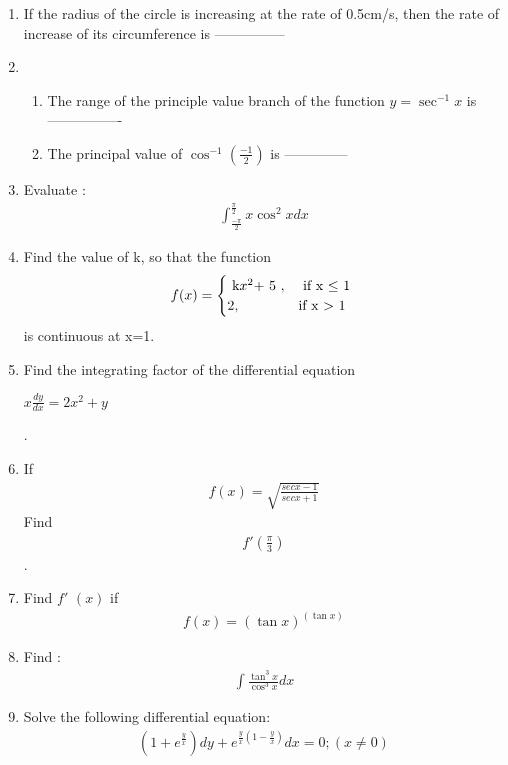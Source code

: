 \documentclass[journal,12pt,twocolumn]{IEEEtran}
\renewcommand\thesection{\arabic{section}}
\begin{document}
\begin{enumerate}[label=\thesection.\arabic*.,ref=\thesection.\theenumi]
\item  If the radius of the circle is increasing at the rate of 0.5cm/s, then the rate of increase of its circumference is ---------------\\
\item \begin{enumerate} \item The range of the principle value branch of the function $ y= \sec^{-1}x $ is ----------------
    
\item The principal value of $\cos^{-1} \left(\frac{-1}{2}\right)$ is --------------\\
\end{enumerate}

\item  Evaluate :
	\begin{align}
         \int_{\frac{-\pi}{2}}^{\frac{\pi}{2}} x \cos^2 x dx \nonumber
	\end{align}  


\item  Find the value of k, so that the function \begin{equation*}  f(x)  = \begin{cases}
                $ k$ x^2 $+ 5 $ ,  &\text{ if  x $\leq$ 1 } \\
        2 , &\text{if x $ > $ 1}
\end{cases} \end{equation*}  is continuous at x=1. \\
\item  Find the integrating factor of the differential equation \begin{center} $ x\frac{dy}{dx} = 2x^2 +y $ \end{center} .
\item If \begin{align} f\left(x\right)= \sqrt{\frac{sec x-1}{sec x+1}}\nonumber \end{align} Find \begin{align} f'\left(\frac{\pi}{3}\right) \nonumber \end{align}.

\item Find $f'$ $\left(x\right)$ if \begin{align} f\left(x\right)=\left(\tan x\right)^{\left(\tan x\right)} \nonumber \end{align}

\item Find :\begin{align} \int \frac{\tan^3x}{\cos^3x} dx \nonumber \end{align} 



\item Solve the following differential equation: \begin{align} (1+e^{\frac{y}{x}}) dy+e^{\frac{y}{x}(1-\frac{y}{x})} dx = 0 ; (x\not= 0) \nonumber \end{align}


\end{enumerate}
\end{document}
